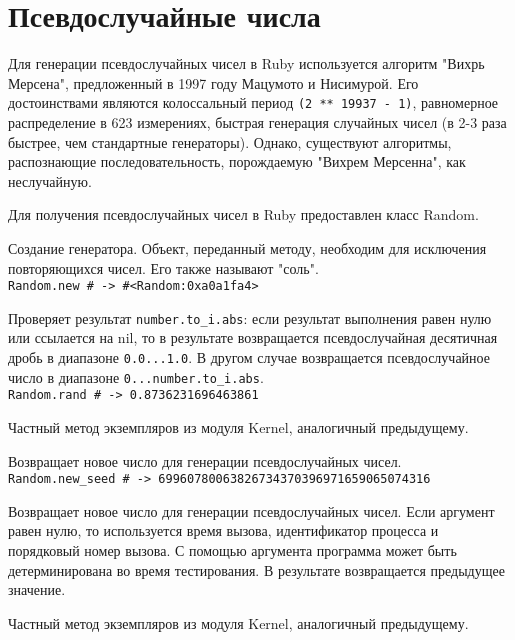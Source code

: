 \chapter{Псевдослучайные числа}

Для генерации псевдослучайных чисел в Ruby используется алгоритм "Вихрь Мерсена", предложенный в 1997 году Мацумото и Нисимурой. Его достоинствами являются колоссальный период \verb!(2 ** 19937 - 1)!, равномерное распределение в 623 измерениях, быстрая генерация случайных чисел (в 2-3 раза быстрее, чем стандартные генераторы). Однако, существуют алгоритмы, распознающие последовательность, порождаемую "Вихрем Мерсенна", как неслучайную.

Для получения псевдослучайных чисел в Ruby предоставлен класс Random.

\begin{methodlist}
  Создание генератора. Объект, переданный методу, необходим для исключения повторяющихся чисел. Его также называют "соль". 
  \\\verb!Random.new # -> #<Random:0xa0a1fa4>! 

  Проверяет результат \verb!number.to_i.abs!: если результат выполнения равен нулю или ссылается на nil, то в результате возвращается псевдослучайная десятичная дробь в диапазоне \verb!0.0...1.0!. В другом случае возвращается псевдослучайное число в диапазоне \verb!0...number.to_i.abs!. 
  \\\verb!Random.rand # -> 0.8736231696463861!

  Частный метод экземпляров из модуля Kernel, аналогичный предыдущему.

  Возвращает новое число для генерации псевдослучайных чисел. 
  \\\verb!Random.new_seed # -> 69960780063826734370396971659065074316!
 
  Возвращает новое число для генерации псевдослучайных чисел. Если аргумент равен нулю, то используется время вызова, идентификатор процесса и порядковый номер вызова. С помощью аргумента программа может быть детерминирована во время тестирования. В результате возвращается предыдущее значение.

  Частный метод экземпляров из модуля Kernel, аналогичный предыдущему.
\end{methodlist}

